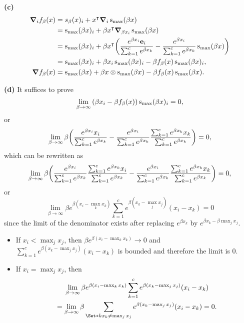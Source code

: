 \documentclass{article}
\makeatletter
\newcommand*{\shifttext}[1]{%
  \settowidth{\@tempdima}{#1}%
  \hspace{-\@tempdima}#1%
}
\newcommand{\plabel}[1]{%
\shifttext{\textbf{#1}\quad}%
}
\newcommand{\minusbaseline}{\abovedisplayskip=0pt\abovedisplayshortskip=0pt~\vspace*{-\baselineskip}}%
\makeatother
\begin{document}
\plabel{(c)}%
\begingroup\minusbaseline
\begin{align*}
    \grad_i f_\beta(x) &= s_\beta(x)_i + x^\intercal \grad_i \operatorname{s}_{\max}(\beta x) \\
    &= \operatorname{s}_{\max}(\beta x)_i + \beta x^\intercal \grad_{\beta x_i} \operatorname{s}_{\max}(\beta x) \\
    &= \operatorname{s}_{\max}(\beta x)_i + \beta x^\intercal \qty(\frac{e^{\beta x_i}\vb{e}_i}{\sum_{k=1}^c e^{\beta x_k}} - \frac{e^{\beta x_i}}{\sum_{k=1}^c e^{\beta x_k}} \operatorname{s}_{\max}(\beta x)) \\
    &= \operatorname{s}_{\max}(\beta x)_i + \beta x_i \operatorname{s}_{\max}(\beta x)_i - \beta f_\beta(x) \operatorname{s}_{\max}(\beta x)_i, \\
    \grad f_\beta(x) &= \operatorname{s}_{\max}(\beta x) + \beta x \otimes \operatorname{s}_{\max}(\beta x) - \beta f_\beta(x) \operatorname{s}_{\max}(\beta x).
\end{align*}
\endgroup

\plabel{(d)}%
It suffices to prove
\[ \lim_{\beta\rightarrow\infty} \qty(\beta x_i - \beta f_\beta(x))\operatorname{s}_{\max}(\beta x)_i = 0, \]
or
\[ \lim_{\beta\rightarrow\infty} \beta \qty(\frac{e^{\beta x_i} x_i}{\sum_{k=1}^c e^{\beta x_k}} - \frac{e^{\beta x_i}}{\sum_{k=1}^c e^{\beta x_k}} \frac{\sum_{k=1}^c e^{\beta x_k} x_k}{\sum_{k=1}^c e^{\beta x_k}} ) = 0, \]
which can be rewritten as
\[ \lim_{\beta\rightarrow\infty} \beta \qty(\frac{e^{\beta x_i}}{\sum_{k=1}^c e^{\beta x_k}} \frac{\sum_{k=1}^c e^{\beta x_k} x_i}{\sum_{k=1}^c e^{\beta x_k}} - \frac{e^{\beta x_i}}{\sum_{k=1}^c e^{\beta x_k}} \frac{\sum_{k=1}^c e^{\beta x_k} x_k}{\sum_{k=1}^c e^{\beta x_k}} ) = 0, \]
or
\[ \lim_{\beta\rightarrow\infty} \beta e^{\beta(x_i - \max_k x_k)} \sum_{k=1}^c e^{\beta (x_k - \max_j x_j)} (x_i - x_k) = 0 \]
since the limit of the denominator exists after replacing $e^{\beta x_k}$ by $e^{\beta x_k - \beta \max_j x_j}$.

\begin{itemize}
    \item If $x_i < \max_j x_j$, then $\beta e^{\beta(x_i - \max_k x_k)} \rightarrow 0$ and $\sum_{k=1}^c e^{\beta (x_k - \max_j x_j)} (x_i - x_k)$ is bounded and therefore the limit is $0$.
    \item If $x_i = \max_j x_j$, then
    \begin{align*}
        &\phantom{{}={}} \lim_{\beta\rightarrow\infty} \beta e^{\beta(x_i - \max_k x_k)} \sum_{k=1}^c e^{\beta (x_k - \max_j x_j)} (x_i - x_k) \\
        &= \lim_{\beta\rightarrow\infty} \beta \sum_{\Set*{k}{x_k\neq \max_j x_j}} e^{\beta(x_k - \max_j x_j)} (x_i - x_k) = 0.
    \end{align*}
\end{itemize}

% 
% 
\end{document}
